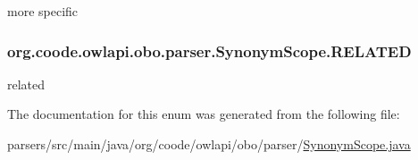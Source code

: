 more specific \hypertarget{enumorg_1_1coode_1_1owlapi_1_1obo_1_1parser_1_1_synonym_scope_af20c2de5c54a82283f18180ad743cd6c}{
\subsubsection[{R\-E\-L\-A\-T\-E\-D}]{\setlength{\rightskip}{0pt plus 5cm}org.\-coode.\-owlapi.\-obo.\-parser.\-Synonym\-Scope.\-R\-E\-L\-A\-T\-E\-D}}\label{enumorg_1_1coode_1_1owlapi_1_1obo_1_1parser_1_1_synonym_scope_af20c2de5c54a82283f18180ad743cd6c}
related 

The documentation for this enum was generated from the following file\-:\begin{DoxyCompactItemize}
\item 
parsers/src/main/java/org/coode/owlapi/obo/parser/\hyperlink{_synonym_scope_8java}{Synonym\-Scope.\-java}\end{DoxyCompactItemize}
